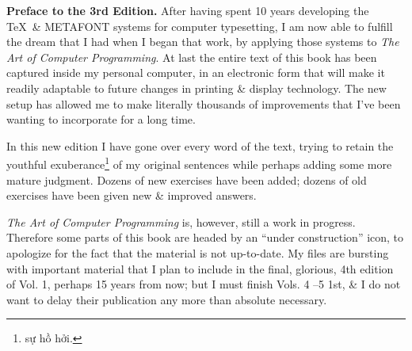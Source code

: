 \documentclass{article}
\begin{document}
{\bf Preface to the 3rd Edition.} After having spent 10 years developing the \TeX\ \& METAFONT systems for computer typesetting, I am now able to fulfill the dream that I had when I began that work, by applying those systems to {\it The Art of Computer Programming}. At last the entire text of this book has been captured inside my personal computer, in an electronic form that will make it readily adaptable to future changes in printing \& display technology. The new setup has allowed me to make literally thousands of improvements that I've been wanting to incorporate for a long time.

In this new edition I have gone over every word of the text, trying to retain the youthful exuberance\footnote{sự hồ hởi.} of my original sentences while perhaps adding some more mature judgment. Dozens of new exercises have been added; dozens of old exercises have been given new \& improved answers.

{\it The Art of Computer Programming} is, however, still a work in progress. Therefore some parts of this book are headed by an ``under construction'' icon, to apologize for the fact that the material is not up-to-date. My files are bursting with important material that I plan to include in the final, glorious, 4th edition of Vol. 1, perhaps 15 years from now; but I must finish Vols. 4 --5 1st, \& I do not want to delay their publication any more than absolute necessary.
\end{document}
